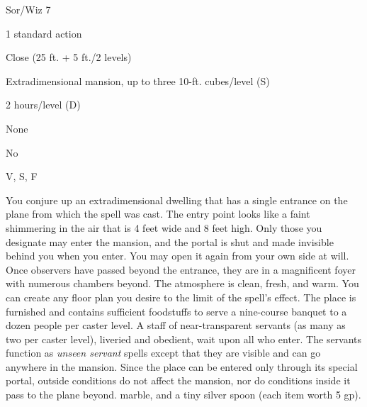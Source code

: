 
\begin{description*}
\item[Level:] Sor/Wiz 7
\item[Casting Time:] 1 standard action
\item[Range:] Close (25 ft. + 5 ft./2 levels)
\item[Effect:] Extradimensional mansion, up to three 10-ft. cubes/level (S)
\item[Duration:] 2 hours/level (D)
\item[Saving Throw:] None
\item[Spell Resistance:] No
\item[Components:] V, S, F
\end{description*}

You conjure up an extradimensional dwelling that has a single entrance on the plane
from which the spell was cast. The entry point looks like a faint shimmering in
the air that is 4 feet wide and 8 feet high. Only those you designate may enter
the mansion, and the portal is shut and made invisible behind you when you enter.
You may open it again from your own side at will. Once observers have passed beyond
the entrance, they are in a magnificent foyer with numerous chambers beyond. The
atmosphere is clean, fresh, and warm.
You can create any floor plan you desire to the limit of the spell's effect. The
place is furnished and contains sufficient foodstuffs to serve a nine-course banquet
to a dozen people per caster level. A staff of near-transparent servants (as many
as two per caster level), liveried and obedient, wait upon all who enter. The servants
function as \textit{unseen servant} spells except that they are visible and can
go anywhere in the mansion.
Since the place can be entered only through its special portal, outside conditions
do not affect the mansion, nor do conditions inside it pass to the plane beyond.
marble, and a tiny silver spoon (each item worth 5 gp).